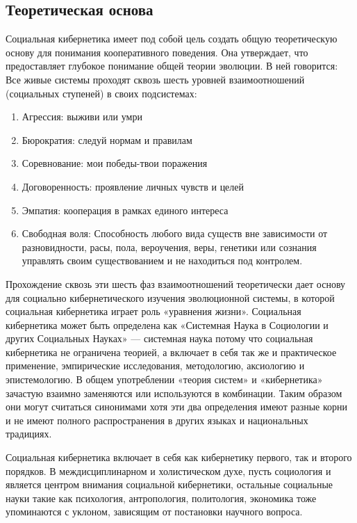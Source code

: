 \documentclass[a4page]{article}
\begin{document}
\subsection{Теоретическая основа}
Социальная кибернетика имеет под собой цель создать общую теоретическую основу для понимания кооперативного поведения. Она утверждает, что предоставляет глубокое понимание общей теории эволюции. В ней говорится: Все живые системы проходят сквозь шесть уровней взаимоотношений (социальных ступеней) в своих подсистемах:

\begin{enumerate}
  \item Агрессия: выживи или умри
  \item Бюрократия: следуй нормам и правилам
  \item Соревнование: мои победы-твои поражения
  \item Договоренность: проявление личных чувств и целей
  \item Эмпатия: кооперация в рамках единого интереса
  \item Свободная воля: Способность любого вида существ вне зависимости от разновидности, расы, пола, вероучения, веры, генетики или сознания управлять своим существованием и не находиться под контролем.
\end{enumerate}

Прохождение сквозь эти шесть фаз взаимоотношений теоретически дает основу для социально кибернетического изучения эволюционной системы, в которой социальная кибернетика играет роль «уравнения жизни». Социальная кибернетика может быть определена как «Системная Наука в Социологии и других Социальных Науках» — системная наука потому что социальная кибернетика не ограничена теорией, а включает в себя так же и практическое применение, эмпирические исследования, методологию, аксиологию и эпистемологию. В общем употреблении «теория систем» и «кибернетика» зачастую взаимно заменяются или используются в комбинации. Таким образом они могут считаться синонимами хотя эти два определения имеют разные корни и не имеют полного распространения в других языках и национальных традициях.

Социальная кибернетика включает в себя как кибернетику первого, так и второго порядков. В междисциплинарном и холистическом духе, пусть социология и является центром внимания социальной кибернетики, остальные социальные науки такие как психология, антропология, политология, экономика тоже упоминаются с уклоном, зависящим от постановки научного вопроса. 
\end{document}
